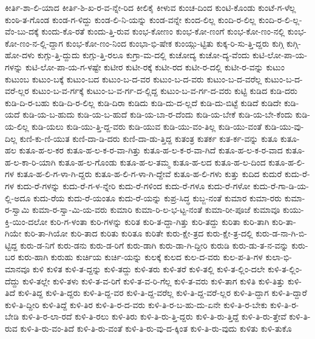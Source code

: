 {ಕೀರ್ತಿ-ಶಾ-ಲಿ-ಯಾದ
ಕೀರ್ತಿ-ಶಿ-ಖ-ರ-ವ-ನ್ನೇ-ರಿದ
ಕೀಲಿಕೈ
ಕೀಳುವ
ಕುಂಚ-ದಿಂದ
ಕುಂಟಿ-ಕೊಂಡು
ಕುಂಟೆ-ಗ-ಳೆಲ್ಲ
ಕುಂಠಿ-ತ-ಗೊಂಡ
ಕುಂಡ-ಗ-ಳಿದ್ದು
ಕುಂಡ-ಲಿ-ನಿ-ಯನ್ನು
ಕುಂಡ-ವನ್ನೇ
ಕುಂದ-ಲಿಲ್ಲ
ಕುಂದಿ-ರ-ಲಿಲ್ಲ
ಕುಂದಿ-ರ-ಲಿ-ಲ್ಲ-ವೆಂ-ಬು-ದಕ್ಕೆ
ಕುಂದು-ಕೊ-ರತೆ
ಕುಂದು-ತ್ತಿ-ರುವ
ಕುಂಭ-ಕೋಣಂ
ಕುಂಭ-ಕೋ-ಣಂಗೆ
ಕುಂಭ-ಕೋ-ಣಂ-ನಲ್ಲಿ
ಕುಂಭ-ಕೋ-ಣಂ-ನ-ಲ್ಲಿ-ದ್ದಾಗ
ಕುಂಭ-ಕೋ-ಣಂ-ನಿಂದ
ಕುಂಭಾ-ಭಿ-ಷೇಕ
ಕುಂಯ್ಗು-ಟ್ಟಿತು
ಕುಕ್ಕ-ರಿ-ಸು-ತ್ತಿ-ದ್ದರು
ಕುಗ್ಗಿ
ಕುಗ್ಗಿ-ಹೋ-ದಳು
ಕುಗ್ಗು-ತ್ತಿ-ದ್ದುದು
ಕುಗ್ಗು-ತ್ತಿ-ರಲೂ
ಕುಗ್ರಾ-ಮ-ದಲ್ಲಿ
ಕುಚೋದ್ಯ
ಕುಚೋ-ದ್ಯ-ವೆಂದು
ಕುಟಿ-ಲೋ-ಪಾ-ಯ-ಗಳನ್ನು
ಕುಟಿ-ಲೋ-ಪಾ-ಯ-ಗ-ಳಷ್ಟೇ
ಕುಟೀರ
ಕುಟೀ-ರಕ್ಕೆ
ಕುಟೀ-ರದ
ಕುಟೀ-ರ-ದಲ್ಲಿ
ಕುಟೀ-ರ-ವನ್ನು
ಕುಟುಂ
ಕುಟುಂಬ
ಕುಟುಂ-ಬಕ್ಕೆ
ಕುಟುಂ-ಬದ
ಕುಟುಂ-ಬ-ದ-ವರ
ಕುಟುಂ-ಬ-ದ-ವರು
ಕುಟುಂ-ಬ-ದ-ವರೆಲ್ಲ
ಕುಟುಂ-ಬ-ದ-ವರೆ-ಲ್ಲರ
ಕುಟುಂ-ಬ-ವ-ರ್ಗಕ್ಕೆ
ಕುಟುಂ-ಬ-ವ-ರ್ಗ-ದ-ಲ್ಲಿದ್ದ
ಕುಟುಂ-ಬ-ವ-ರ್ಗ-ದ-ವರು
ಕುಟ್ಟಿ
ಕುಡಿದ
ಕುಡಿ-ದರು
ಕುಡಿ-ದಿ-ರ-ಬಹು
ಕುಡಿ-ದಿ-ರ-ಲಿಲ್ಲ
ಕುಡಿ-ದಿರಾ
ಕುಡಿದು
ಕುಡಿ-ದು-ದ-ಲ್ಲದೆ
ಕುಡಿ-ದು-ಬಿಟ್ಟೆ
ಕುಡಿದೆ
ಕುಡಿದೇ
ಕುಡಿ-ಯದೆ
ಕುಡಿ-ಯ-ಬ-ಹುದು
ಕುಡಿ-ಯ-ಬ-ಹುದೆ
ಕುಡಿ-ಯ-ಬಾ-ರ-ದೆಂದು
ಕುಡಿ-ಯ-ಬೇಕೆ
ಕುಡಿ-ಯ-ಬೇ-ಕೆಂದು
ಕುಡಿ-ಯ-ಲಿಲ್ಲ
ಕುಡಿ-ಯಲು
ಕುಡಿ-ಯು-ತ್ತಿ-ದ್ದ-ವರು
ಕುಡಿ-ಯುವ
ಕುಡಿ-ಯು-ವಂ-ತಿಲ್ಲ
ಕುಡಿ-ಯು-ವಂತೆ
ಕುಡಿ-ಯು-ವು-ದಿಲ್ಲ
ಕುಣಿ-ಕು-ಣಿ-ಯುತ
ಕುಣಿ-ದಾ-ಡಿ-ದರು
ಕುಣಿ-ದಾ-ಡು-ತ್ತಿದ್ದ
ಕುತಂತ್ರ
ಕುತರ್ಕ
ಕುತ-ರ್ಕ-ವನ್ನು
ಕುತೂ
ಕುತೂ-ಹಲ
ಕುತೂ-ಹ-ಲ-ಕರ
ಕುತೂ-ಹ-ಲ-ಕ-ರ-ವಾ-ಗಿತ್ತು
ಕುತೂ-ಹ-ಲ-ಕ-ರ-ವಾ-ಗಿದೆ
ಕುತೂ-ಹ-ಲ-ಕ-ರ-ವಾದ
ಕುತೂ-ಹ-ಲ-ಕಾ-ರಿ-ಯಾಗಿ
ಕುತೂ-ಹ-ಲ-ಗೊಂಡು
ಕುತೂ-ಹ-ಲ-ತಮ್ಮ
ಕುತೂ-ಹ-ಲದ
ಕುತೂ-ಹ-ಲ-ದಿಂದ
ಕುತೂ-ಹ-ಲಿ-ಗಳ
ಕುತೂ-ಹ-ಲಿ-ಗ-ಳಾ-ಗಿ-ದ್ದರು
ಕುತೂ-ಹ-ಲಿ-ಗ-ಳಾ-ಗಿ-ದ್ದೇವೆ
ಕುತೂ-ಹ-ಲಿ-ಗಳು
ಕುತ್ತು
ಕುದಿದ
ಕುದುರೆ
ಕುದು-ರೆ-ಗಳ
ಕುದು-ರೆ-ಗಳನ್ನು
ಕುದು-ರೆ-ಗ-ಳ-ನ್ನೇರಿ
ಕುದು-ರೆ-ಗಳಿಂದ
ಕುದು-ರೆ-ಗಳೂ
ಕುದು-ರೆ-ಗಳೋ
ಕುದು-ರೆ-ಗಾ-ಡಿ-ಯ-ಲ್ಲಿ-ಅದೂ
ಕುದು-ರೆಯ
ಕುದು-ರೆ-ಯಂತೂ
ಕುದು-ರೆ-ಯನ್ನು
ಕುಪ್ರ-ಸಿದ್ಧ
ಕುಬ್ಜ-ನಂತೆ
ಕುಮಾರ
ಕುಮಾ-ರರು
ಕುಮಾ-ರ-ಸ್ವಾಮಿ
ಕುಮಾ-ರ-ಸ್ವಾ-ಮಿ-ಯ-ವರು
ಕುಮಾರಿ
ಕುಮಾ-ರಿ-ಲ-ಭ-ಟ್ಟ-ನಂತೆ
ಕುಮಾ-ರೀ-ಪೂಜೆ
ಕುಮಾವೂ
ಕುಯು-ಕ್ತಿ-ಯಿಂ-ದಲೋ
ಕುರಿ-ಗ-ಳಂತಾ
ಕುರಿ-ಗಳನ್ನು
ಕುರಿತ
ಕುರಿ-ತ-ದ್ದಾ-ಗಿತ್ತು
ಕುರಿ-ತದ್ದು
ಕುರಿತಾ
ಕುರಿ-ತಾಗಿ
ಕುರಿ-ತಾ-ಗಿಯೇ
ಕುರಿ-ತಾ-ಗಿಯೋ
ಕುರಿ-ತಾದ
ಕುರಿತು
ಕುರಿತೂ
ಕುರಿತೇ
ಕುರು-ಕ್ಷೇ-ತ್ರದ
ಕುರು-ಕ್ಷೇ-ತ್ರ-ದಲ್ಲಿ
ಕುರು-ಡ-ನಾ-ಗಿ-ಬಿ-ಟ್ಟಿದ್ದ
ಕುರು-ಡ-ನಿಗೆ
ಕುರು-ಡನು
ಕುರು-ಡ-ರಿಗೆ
ಕುರು-ಡಾಗಿ
ಕುರು-ಡಾ-ಗಿ-ದ್ದೀರಿ
ಕುರುಡಿ
ಕುರು-ಡು-ತ-ನ-ವನ್ನು
ಕುರು-ಬರ
ಕುರು-ಹಾಗಿ
ಕುರುಹು
ಕುರ್ಚಿಯ
ಕುರ್ಚಿ-ಯನ್ನು
ಕುಲಕ್ಕೆ
ಕುಲದ
ಕುಲ-ದ-ವರು
ಕುಲ-ಪ-ತಿ-ಗಳ
ಕುಲಾ-ಭಿ-ಮಾನವೂ
ಕುಳಿ
ಕುಳಿತ
ಕುಳಿ-ತ-ದ್ದನ್ನು
ಕುಳಿ-ತದ್ದು
ಕುಳಿ-ತರು
ಕುಳಿ-ತರೆ
ಕುಳಿ-ತಲ್ಲಿ
ಕುಳಿ-ತ-ಲ್ಲಿಂ-ದಲೇ
ಕುಳಿ-ತ-ಲ್ಲಿಂ-ದೆದ್ದು
ಕುಳಿ-ತಲ್ಲೇ
ಕುಳಿ-ತಳು
ಕುಳಿ-ತ-ವ-ರಿಗೆ
ಕುಳಿ-ತ-ವ-ರಿ-ಗೆಲ್ಲ
ಕುಳಿ-ತ-ವರು
ಕುಳಿ-ತಾಗ
ಕುಳಿತಿ
ಕುಳಿ-ತಿತ್ತು
ಕುಳಿ-ತಿದೆ
ಕುಳಿ-ತಿದ್ದ
ಕುಳಿ-ತಿ-ದ್ದರು
ಕುಳಿ-ತಿ-ದ್ದ-ವರ
ಕುಳಿ-ತಿ-ದ್ದ-ವರೆಲ್ಲ
ಕುಳಿ-ತಿ-ದ್ದ-ವರೆ-ಲ್ಲರ
ಕುಳಿ-ತಿ-ದ್ದಾಗ
ಕುಳಿ-ತಿ-ದ್ದಾರೆ
ಕುಳಿ-ತಿ-ದ್ದೀರಿ
ಕುಳಿ-ತಿದ್ದೆ
ಕುಳಿ-ತಿರ
ಕುಳಿ-ತಿ-ರ-ದ-ವರು
ಕುಳಿ-ತಿ-ರ-ಬ-ಹು-ದು-ಏನೇ
ಕುಳಿ-ತಿ-ರ-ಬೇಕು
ಕುಳಿ-ತಿ-ರ-ಬೇಡಿ
ಕುಳಿ-ತಿ-ರ-ಲಾ-ರದೆ
ಕುಳಿ-ತಿ-ರಲು
ಕುಳಿ-ತಿರು
ಕುಳಿ-ತಿ-ರು-ತ್ತಿ-ದ್ದರು
ಕುಳಿ-ತಿ-ರು-ತ್ತಿದ್ದೆ
ಕುಳಿ-ತಿ-ರು-ತ್ತೇವೆ
ಕುಳಿ-ತಿ-ರುವ
ಕುಳಿ-ತಿ-ರು-ವಂ-ತಿದೆ
ಕುಳಿ-ತಿ-ರು-ವಂತೆ
ಕುಳಿ-ತಿ-ರು-ವು-ದ-ಕ್ಕಿಂತ
ಕುಳಿ-ತಿ-ರು-ವುದು
ಕುಳಿತು
ಕುಳಿ-ತುಕೊ
}
